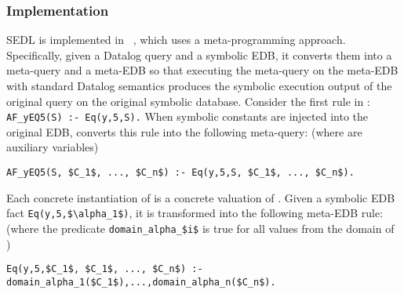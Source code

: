 \subsubsection{Implementation}
SEDL is implemented in \Symlog~\cite{DBLP:conf/sigsoft/LiuMSR23}, which uses a meta-programming approach. Specifically, given a Datalog query and a symbolic EDB, it converts them into a meta-query and a meta-EDB so that executing the meta-query on the meta-EDB with standard Datalog semantics produces the symbolic execution output of the original query on the original symbolic database.
Consider the first rule in : \lstinline[mathescape]`AF_yEQ5(S) :- Eq(y,5,S).` When symbolic constants  are injected into the original EDB, \Symlog converts this rule into the following meta-query: (where  are auxiliary variables)
\begin{lstlisting}[mathescape, xleftmargin=0em,numbers=none,basicstyle=\footnotesize\ttfamily]
AF_yEQ5(S, $C_1$, ..., $C_n$) :- Eq(y,5,S, $C_1$, ..., $C_n$).
\end{lstlisting}
\noindent Each concrete instantiation of  is a  concrete valuation of .
Given a symbolic EDB fact \lstinline[mathescape]`Eq(y,5,$\alpha_1$)`, it is transformed into the following meta-EDB rule: 
(where the predicate \lstinline[mathescape]`domain_alpha_$i$` is true for all values from the domain of )
\begin{lstlisting}[mathescape, xleftmargin=0em,numbers=none,basicstyle=\footnotesize\ttfamily]
Eq(y,5,$C_1$, $C_1$, ..., $C_n$) :- domain_alpha_1($C_1$),...,domain_alpha_n($C_n$).
\end{lstlisting}


